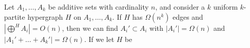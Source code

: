 Let $A_1, \dots, A_k$ be additive sets with cardinality $n$, and consider a $k$ uniform $k$-partite hypergraph $H$ on $A_1, \dots, A_k$. If $H$ has $\Omega(n^k)$ edges and $|\bigoplus^H A_i| = O(n)$, then we can find $A_i' \subset A_i$ with $|A_i'| = \Omega(n)$ and $|A_1' + \dots + A_k'| = \Omega(n)$. If we let $H$ be 

